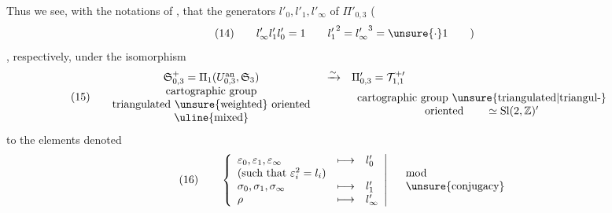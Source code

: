 Thus we see, with the notations of \hspace{3em}, that the generators
$l'_0,l'_1,l'_\infty$ of $\Pi'_{0,3}$
(
\[
(14)\qquad l'_\infty l'_1 l'_0=1
\qquad {l'_1}^{2}={l'_\infty}^{3}=\unsure{\cdot}1\qquad )
\]
, respectively, under the isomorphism
\[
(15)\quad
\begin{array}{ccl}
\mathfrak{S}_{0,3}^{+}
=\Pi_1(U_{0,3}^{\mathrm{an}},\mathfrak{S}_3)
&\xrightarrow{\sim}&\Pi'_{0,3}=\mathcal{T}_{1,1}^{+\prime}\\
\begin{array}{c}
\text{cartographic group}\\
\text{triangulated \unsure{weighted} oriented}\\
\text{\uline{mixed}}
\end{array}
&&\begin{array}{c}
\text{cartographic group \unsure{triangulated|triangul-}}\\
\text{oriented}\qquad \simeq\mathrm{Sl}(2,\mathbb{Z})'
\end{array}
\end{array}
\]
to the elements denoted
\[
(16)\qquad
\left\{\begin{array}{lll}
\varepsilon_0,\varepsilon_1,\varepsilon_\infty&\longmapsto&l'_0\\
\text{(such that $\varepsilon_i^2=l_i$)}&&\\
\sigma_0,\sigma_1,\sigma_\infty&\longmapsto&l'_1\\
\rho&\longmapsto&l'_\infty
\end{array}\right|\quad
\begin{array}{l}\mathrm{mod}\\\text{\unsure{conjugacy}}\end{array}
\]



